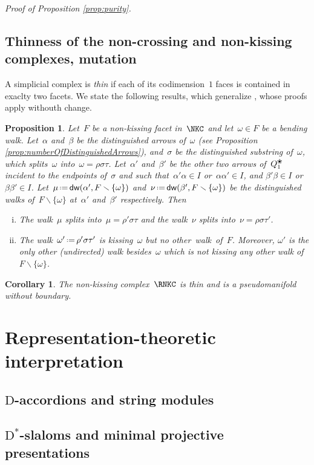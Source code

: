 \documentclass{amsart}
\newtheorem{corollary}[theorem]{Corollary}
\newtheorem{proposition}[theorem]{Proposition}
\theoremstyle{definition}
\newcommand{\ssm}{\smallsetminus} %
\newcommand{\eqdef}{\mbox{\,\raisebox{0.2ex}{\scriptsize\ensuremath{\mathrm:}}\ensuremath{=}\,}} %
\newcommand{\darkblue}{\color{darkblue}} %
\newcommand{\defn}[1]{\textsl{\darkblue #1}} %
\newcommand{\pierreguy}[1]{\todo[color=green!30]{#1 \\ \hfill --- PG.}}
\newcommand{\blossom}{^\text{\ding{96}}} %
\newcommand{\distinguishedWalk}[2]{\mathsf{dw}(#1,#2)} %
\newcommand{\dual}{^*} %
\newcommand{\dissection}{\mathrm{D}} %
\begin{document}
{\it Proof of Proposition \ref{prop:purity}.}
\pierreguy{TO DO}

\subsection{Thinness of the non-crossing and non-kissing complexes, mutation}

A simplicial complex is \defn{thin} if each of its codimension~$1$ faces is contained in exaclty two facets.
We state the following results, which generalize \cite[Proposition 2.31 and Corollary 2.33]{PaluPilaudPlamondon}, whose proofs apply withouth change.

\begin{proposition}
\label{prop:flip}
Let~$F$ be a non-kissing facet in~$\NKC$ and let~$\omega \in F$ be a bending walk.
Let~$\alpha$ and~$\beta$ be the distinguished arrows of~$\omega$ (see Proposition \ref{prop:numberOfDistinguishedArrows}), and~$\sigma$ be the distinguished substring of~$\omega$, which splits~$\omega$ into~$\omega = \rho \sigma \tau$.
Let~$\alpha'$ and~$\beta'$ be the other two arrows of~$Q_1\blossom$ incident to the endpoints of~$\sigma$ and such that~$\alpha'\alpha \in I$ or~$\alpha\alpha' \in I$, and $\beta'\beta \in I$ or~$\beta\beta' \in I$.
Let~$\mu \eqdef \distinguishedWalk{\alpha'}{F \ssm \{\omega\}}$ and~$\nu \eqdef \distinguishedWalk{\beta'}{F \ssm \{\omega\}}$ be the distinguished walks of~$F \ssm \{\omega\}$ at~$\alpha'$ and~$\beta'$ respectively.
Then
\begin{enumerate}[(i)]
\item The walk~$\mu$ splits into~$\mu = \rho' \sigma \tau$ and the walk~$\nu$ splits into~$\nu = \rho \sigma \tau'$.
\item The walk~$\omega' \eqdef \rho' \sigma \tau'$ is kissing~$\omega$ but no other~walk~of~$F$. Moreover, $\omega'$ is the only other (undirected) walk besides~$\omega$ which is not kissing any other walk of~$F \ssm \{\omega\}$.
\end{enumerate}
\end{proposition}

\begin{corollary}
The non-kissing complex~$\RNKC$ is thin and is a pseudomanifold without boundary.
\end{corollary}


\section{Representation-theoretic interpretation}

\subsection{$\dissection$-accordions and string modules}

\subsection{$\dissection\dual$-slaloms and minimal projective presentations}




\label{sec:biblio}
\end{document}
